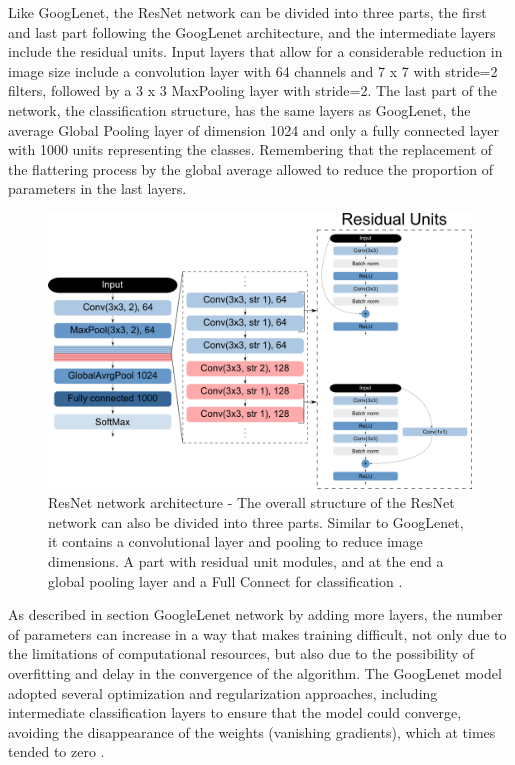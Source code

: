 Like GoogLenet, the ResNet network can be divided into three parts, the first and last part following the GoogLenet architecture, and the intermediate layers include the residual units. Input layers that allow for a considerable reduction in image size include a convolution layer with 64 channels and 7 x 7 with stride=2 filters, followed by a 3 x 3 MaxPooling layer with stride=2. The last part of the network, the classification structure, has the same layers as GoogLenet, the average Global Pooling layer of dimension 1024 and only a fully connected layer with 1000 units representing the classes. Remembering that the replacement of the flattering process by the global average allowed to reduce the proportion of parameters in the last layers.

\begin{figure}
    \centering
    \includegraphics[scale=0.4]{"Part 3 - Learning Systems/Supervised Learning/Deep Learning/images/figure135.png"}
    \caption{ResNet network architecture - The overall structure of the ResNet network can also be divided into three parts. Similar to GoogLenet, it contains a convolutional layer and pooling to reduce image dimensions. A part with residual unit modules, and at the end a global pooling layer and a Full Connect for classification \cite{geron2019}.}
    \label{fig:figure135}
\end{figure}

As described in section GoogleLenet network by adding more layers, the number of parameters can increase in a way that makes training difficult, not only due to the limitations of computational resources, but also due to the possibility of overfitting and delay in the convergence of the algorithm. The GoogLenet model adopted several optimization and regularization approaches, including intermediate classification layers to ensure that the model could converge, avoiding the disappearance of the weights (vanishing gradients), which at times tended to zero \cite{geron2019}.

